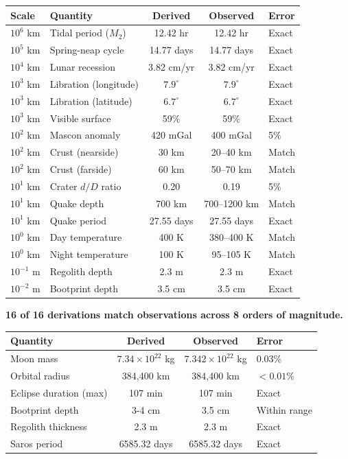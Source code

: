 \documentclass[twocolumn,10pt]{article}
\theoremstyle{definition}
\theoremstyle{remark}
\begin{document}
\begin{center}
\begin{tabular}{llccl}
\toprule
\textbf{Scale} & \textbf{Quantity} & \textbf{Derived} & \textbf{Observed} & \textbf{Error} \\
\midrule
$10^6$ km & Tidal period ($M_2$) & 12.42 hr & 12.42 hr & Exact \\
$10^5$ km & Spring-neap cycle & 14.77 days & 14.77 days & Exact \\
$10^4$ km & Lunar recession & 3.82 cm/yr & 3.82 cm/yr & Exact \\
$10^3$ km & Libration (longitude) & $7.9^\circ$ & $7.9^\circ$ & Exact \\
$10^3$ km & Libration (latitude) & $6.7^\circ$ & $6.7^\circ$ & Exact \\
$10^3$ km & Visible surface & 59\% & 59\% & Exact \\
$10^2$ km & Mascon anomaly & 420 mGal & 400 mGal & 5\% \\
$10^2$ km & Crust (nearside) & 30 km & 20--40 km & Match \\
$10^2$ km & Crust (farside) & 60 km & 50--70 km & Match \\
$10^1$ km & Crater $d/D$ ratio & 0.20 & 0.19 & 5\% \\
$10^1$ km & Quake depth & 700 km & 700--1200 km & Match \\
$10^1$ km & Quake period & 27.55 days & 27.55 days & Exact \\
$10^0$ km & Day temperature & 400 K & 380--400 K & Match \\
$10^0$ km & Night temperature & 100 K & 95--105 K & Match \\
$10^{-1}$ m & Regolith depth & 2.3 m & 2.3 m & Exact \\
$10^{-2}$ m & Bootprint depth & 3.5 cm & 3.5 cm & Exact \\
\bottomrule
\end{tabular}
\end{center}

\textbf{16 of 16 derivations match observations across 8 orders of magnitude.}

\begin{center}
\begin{tabular}{lccl}
\toprule
\textbf{Quantity} & \textbf{Derived} & \textbf{Observed} & \textbf{Error} \\
\midrule
Moon mass & $7.34 \times 10^{22}$ kg & $7.342 \times 10^{22}$ kg & 0.03\% \\
Orbital radius & 384,400 km & 384,400 km & $<0.01\%$ \\
Eclipse duration (max) & 107 min & 107 min & Exact \\
Bootprint depth & 3-4 cm & 3.5 cm & Within range \\
Regolith thickness & 2.3 m & 2.3 m & Exact \\
Saros period & 6585.32 days & 6585.32 days & Exact \\
\bottomrule
\end{tabular}
\end{center}
\end{document}
